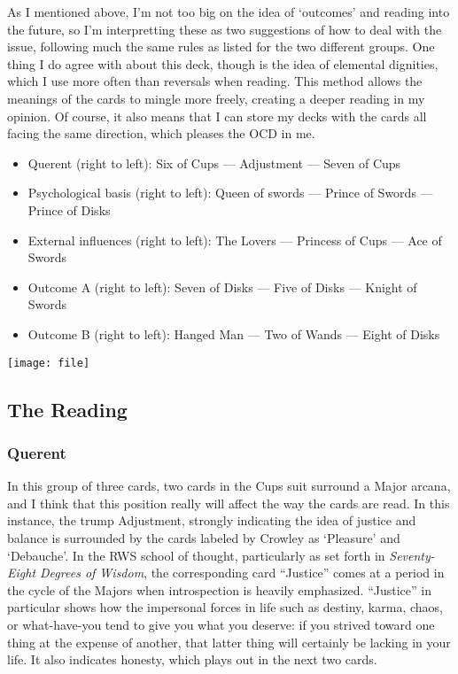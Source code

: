As I mentioned above, I'm not too big on the idea of `outcomes' and
reading into the future, so I'm interpretting these as two suggestions
of how to deal with the issue, following much the same rules as listed
for the two different groups.  One thing I do agree with about this
deck, though is the idea of elemental dignities, which I use more often
than reversals when reading.  This method allows the meanings of the
cards to mingle more freely, creating a deeper reading in my opinion.
Of course, it also means that I can store my decks with the cards all
facing the same direction, which pleases the OCD in me.

\begin{itemize}
  \item Querent (right to left): Six of Cups --- Adjustment --- Seven of
  Cups
  \item Psychological basis (right to left): Queen of swords --- Prince
  of Swords --- Prince of Disks
  \item External influences (right to left): The Lovers --- Princess of
  Cups --- Ace of Swords
  \item Outcome A (right to left): Seven of Disks --- Five of Disks ---
  Knight of Swords
  \item Outcome B (right to left): Hanged Man --- Two of Wands --- Eight
  of Disks
\end{itemize}
\texttt{[image: file]}

\subsection*{The Reading}
\subsubsection*{Querent}
In this group of three cards, two cards in the Cups suit surround a
Major arcana, and I think that this position really will affect the way
the cards are read.  In this instance, the trump Adjustment, strongly
indicating the idea of justice and balance is surrounded by the cards
labeled by Crowley as `Pleasure' and `Debauche'.  In the RWS school of
thought, particularly as set forth in \textit{Seventy-Eight Degrees of
Wisdom}\cite{pollack97}, the corresponding card ``Justice'' comes at a
period in the cycle of the Majors when introspection is heavily
emphasized.  ``Justice'' in particular shows how the impersonal forces
in life such as destiny, karma, chaos, or what-have-you tend to give you
what you deserve: if you strived toward one thing at the expense of
another, that latter thing will certainly be lacking in your life.  It
also indicates honesty, which plays out in the next two cards.

